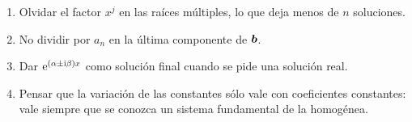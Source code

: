 \begin{observacion}\label{obs:errores}
\leavevmode
\begin{enumerate}[label=(\roman*)]
  \item Olvidar el factor $x^{j}$ en las raíces múltiples, lo que deja menos
        de $n$ soluciones.
  \item No dividir por $a_n$ en la última componente de $\bm{b}$.
  \item Dar $\mathrm{e}^{(\alpha\pm\mathrm{i}\beta)x}$ como solución final cuando se pide
        una solución real.
  \item Pensar que la variación de las constantes sólo vale con
        coeficientes constantes: vale siempre que se conozca un sistema
        fundamental de la homogénea.
\end{enumerate}
\end{observacion}
